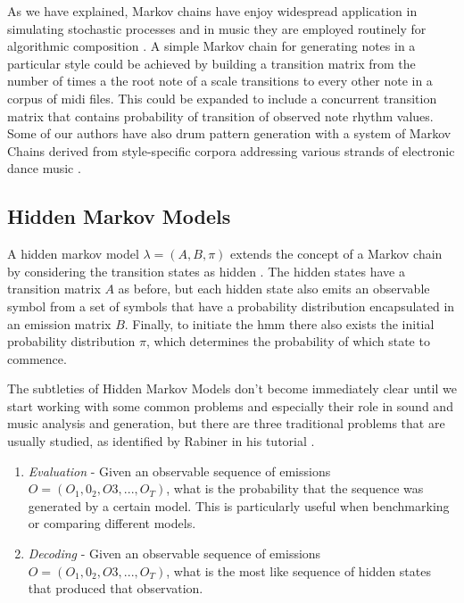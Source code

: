 {{{{{{{As we have explained, Markov chains have enjoy widespread application in simulating stochastic processes and in music they are employed routinely for algorithmic composition \citep{Fernandez2013, Eigenfeldt2009,Jorda2016}. A simple Markov chain for generating notes in a particular style could be achieved by building a transition matrix from the number of times a the root note of a scale transitions to every other note in a corpus of \acrshort{midi} files. This could be expanded to include a concurrent transition matrix that contains probability of transition of observed note rhythm values. Some of our authors have also drum pattern generation with a system of Markov Chains derived from style-specific corpora addressing various strands of electronic dance music \citep{Jorda2016}.

\subsection{Hidden Markov Models}

A hidden markov model $\lambda = (A, B, \pi)$ extends the concept of a Markov chain by considering the transition states as hidden \citep{Rabiner1989}. The hidden states have a  transition matrix $A$ as before, but each hidden state also emits an observable symbol from a set of symbols that have a probability distribution encapsulated in an emission matrix $B$. Finally, to initiate the \acrshort{hmm} there also exists the initial probability distribution $\pi$, which determines the probability of which state to commence. 

The subtleties of Hidden Markov Models don’t become immediately clear until we start working with some common problems and especially their role in sound and music analysis and generation, but there are three traditional problems that are usually studied, as identified by Rabiner in his tutorial \citeyearpar{Rabiner1989}.

\begin{enumerate}
  \item \textit{Evaluation}  - Given an observable sequence of emissions $O = (O_1, 0_2, O3,..., O_T)$, what is the probability that the sequence was generated by a certain model. This is particularly useful when benchmarking or comparing different models. 

\item \textit{Decoding} - Given an observable sequence of emissions $O = (O_1, 0_2, O3,..., O_T)$, what is the most like sequence of hidden states that produced that observation.


\end{enumerate}}}}}}}}
